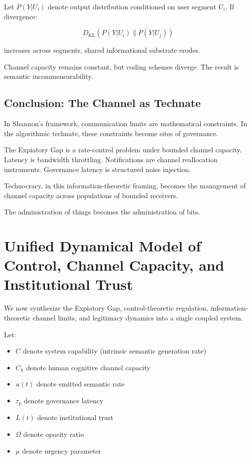 \documentclass[12pt]{article}
\begin{document}
Let $P(Y|U_i)$ denote output distribution conditioned on user segment $U_i$. If divergence:

\[
D_{\text{KL}}(P(Y|U_i) \parallel P(Y|U_j))
\]

increases across segments, shared informational substrate erodes.

Channel capacity remains constant, but coding schemes diverge. The result is semantic incommensurability.

\subsection*{Conclusion: The Channel as Technate}

In Shannon’s framework, communication limits are mathematical constraints. In the algorithmic technate, these constraints become sites of governance.

The Expiatory Gap is a rate-control problem under bounded channel capacity. Latency is bandwidth throttling. Notifications are channel reallocation instruments. Governance latency is structured noise injection.

Technocracy, in this information-theoretic framing, becomes the management of channel capacity across populations of bounded receivers.

The administration of things becomes the administration of bits.

\section{Unified Dynamical Model of Control, Channel Capacity, and Institutional Trust}

We now synthesize the Expiatory Gap, control-theoretic regulation, information-theoretic channel limits, and legitimacy dynamics into a single coupled system.

Let:

\begin{itemize}
\item $C$ denote system capability (intrinsic semantic generation rate)
\item $C_h$ denote human cognitive channel capacity
\item $u(t)$ denote emitted semantic rate
\item $\tau_p$ denote governance latency
\item $L(t)$ denote institutional trust
\item $\Omega$ denote opacity ratio
\item $\mu$ denote urgency parameter
\end{itemize}
\end{document}
